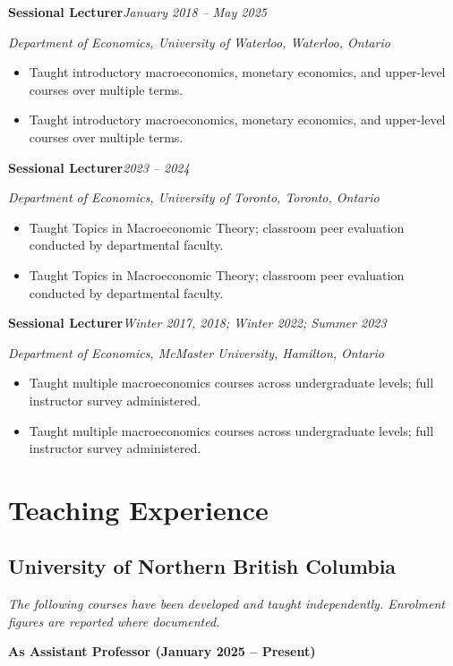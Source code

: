 \documentclass[11pt,letterpaper]{article}
\newcommand{\cventry}[4]{%
  \noindent\textbf{#2}\hfill\textit{\small #1}\par
  \noindent\textit{#3}\par
  \ifx\relax#4\relax\else
    \vspace{1pt}%
    #4%
  \fi
  \vspace{5pt}%
}
\begin{document}
\cventry{January 2018 -- May 2025}{Sessional Lecturer}{Department of Economics, University of Waterloo, Waterloo, Ontario}{%
  \begin{itemize}
    \item Taught introductory macroeconomics, monetary economics, and upper-level courses over multiple terms.
  \end{itemize}
}

\cventry{2023 -- 2024}{Sessional Lecturer}{Department of Economics, University of Toronto, Toronto, Ontario}{%
  \begin{itemize}
    \item Taught Topics in Macroeconomic Theory; classroom peer evaluation conducted by departmental faculty.
  \end{itemize}
}

\newpage

\cventry{Winter 2017, 2018; Winter 2022; Summer 2023}{Sessional Lecturer}{Department of Economics, McMaster University, Hamilton, Ontario}{%
  \begin{itemize}
    \item Taught multiple macroeconomics courses across undergraduate levels; full instructor survey administered.
  \end{itemize}
}

\section{Teaching Experience}

\subsection{University of Northern British Columbia}

\textit{The following courses have been developed and taught independently. Enrolment figures are reported where documented.}

\vspace{4pt}

\textbf{As Assistant Professor (January 2025 -- Present)}

\vspace{3pt}
\end{document}
